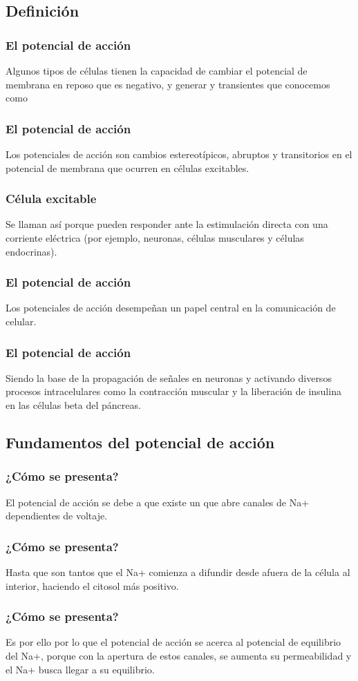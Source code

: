 \documentclass[14pt]{beamer}
\begin{document}
\subsection{Definición}

\begin{frame}
\frametitle{El potencial de acción}
Algunos tipos de células tienen la capacidad de cambiar el potencial de membrana en reposo que es negativo, \pause y generar  y transientes \pause que conocemos como 
\end{frame}
\begin{frame}
\frametitle{El potencial de acción}
Los potenciales de acción son cambios estereotípicos, abruptos y transitorios en el potencial de membrana que ocurren en células excitables.
\end{frame}
\begin{frame}
\frametitle{Célula excitable}
Se llaman así porque pueden responder ante la estimulación directa con una corriente eléctrica (por ejemplo, neuronas, células musculares y células endocrinas).
\end{frame}
\begin{frame}
\frametitle{El potencial de acción}
Los potenciales de acción desempeñan un papel central en la comunicación de celular.
\end{frame}
\begin{frame}
\frametitle{El potencial de acción}
Siendo la base de la propagación de señales en neuronas \pause y activando diversos procesos intracelulares como la contracción muscular y la liberación de insulina en las células beta del páncreas.
\end{frame}

\subsection{Fundamentos del potencial de acción}

\begin{frame}
\frametitle{¿Cómo se presenta?}
El potencial de acción se debe a que existe un  \pause que abre canales de Na+ dependientes de voltaje.
\end{frame}
\begin{frame}
\frametitle{¿Cómo se presenta?}
Hasta que son tantos que el Na+ comienza a difundir desde afuera de la célula al interior, haciendo el citosol más positivo.
\end{frame}
\begin{frame}
\frametitle{¿Cómo se presenta?}
Es por ello por lo que el potencial de acción se acerca al potencial de equilibrio del Na+, \pause porque con la apertura de estos canales, se aumenta su permeabilidad y el Na+ busca llegar a su equilibrio.
\end{frame}
\end{document}
